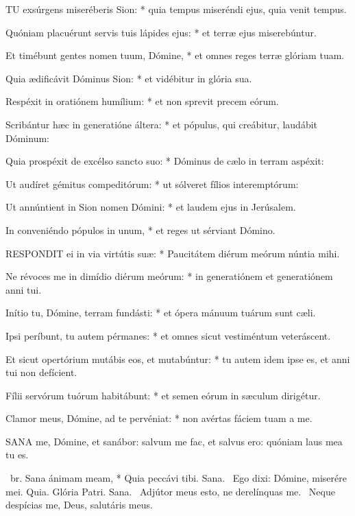 
\lettrine[lines=2]{T}{U} exsúrgens miseréberis Sion: * quia tempus miseréndi ejus, quia venit tempus.

Quóniam placuérunt servis tuis lápides ejus: * et terræ ejus miserebúntur.

Et timébunt gentes nomen tuum, Dómine, * et omnes reges terræ glóriam tuam.

Quia ædificávit Dóminus Sion: * et vidébitur in glória sua.

Respéxit in oratiónem humílium: * et non sprevit precem eórum.

Scribántur hæc in generatióne áltera: * et pópulus, qui creábitur, laudábit Dóminum:

Quia prospéxit de excélso sancto suo: * Dóminus de cælo in terram aspéxit:

Ut audíret gémitus compeditórum: * ut sólveret fílios interemptórum:

Ut annúntient in Sion nomen Dómini: * et laudem ejus in Jerúsalem.

In conveniéndo pópulos in unum, * et reges ut sérviant Dómino.


\lettrine[lines=2]{R}{ESPONDIT} ei in via virtútis suæ: * Paucitátem diérum meórum núntia mihi.

Ne révoces me in dimídio diérum meórum: * in generatiónem et generatiónem anni tui.

Inítio tu, Dómine, terram fundásti: * et ópera mánuum tuárum sunt cæli.

Ipsi períbunt, tu autem pérmanes: * et omnes sicut vestiméntum veteráscent.

Et sicut opertórium mutábis eos, et mutabúntur: * tu autem idem ipse es, et anni tui non defícient.

Fílii servórum tuórum habitábunt: * et semen eórum in sæculum dirigétur.

 Clamor meus, Dómine, ad te pervéniat: * non avértas fáciem tuam a me.



\lettrine[lines=2]{S}{ANA} me, Dómine, et sanábor: salvum me fac, et salvus ero: quóniam laus mea tu es.

\R\ br. Sana ánimam meam, * Quia peccávi tibi. Sana. \V\ Ego dixi: Dómine, miserére mei. Quia. Glória Patri. Sana. \V\ Adjútor meus esto, ne derelínquas me. \R\ Neque despícias me, Deus, salutáris meus.

